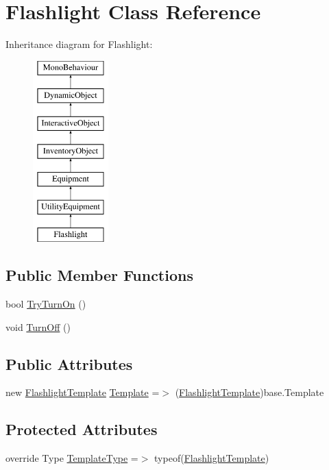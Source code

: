 \hypertarget{class_flashlight}{}\section{Flashlight Class Reference}
\label{class_flashlight}
Inheritance diagram for Flashlight\+:\begin{figure}[H]
\begin{center}
\leavevmode
\includegraphics[height=7.000000cm]{class_flashlight}
\end{center}
\end{figure}
\subsection*{Public Member Functions}
\begin{DoxyCompactItemize}
\item 
bool \mbox{\hyperlink{class_flashlight_a9cf56fe93b952c00c6fd3e7ea335eb26}{Try\+Turn\+On}} ()
\item 
void \mbox{\hyperlink{class_flashlight_adcf66c329c6f6fdc47ef2418fc55fb73}{Turn\+Off}} ()
\end{DoxyCompactItemize}
\subsection*{Public Attributes}
\begin{DoxyCompactItemize}
\item 
new \mbox{\hyperlink{class_flashlight_template}{Flashlight\+Template}} \mbox{\hyperlink{class_flashlight_a8f9854554124413d370b500dad133297}{Template}} =$>$ (\mbox{\hyperlink{class_flashlight_template}{Flashlight\+Template}})base.\+Template
\end{DoxyCompactItemize}
\subsection*{Protected Attributes}
\begin{DoxyCompactItemize}
\item 
override Type \mbox{\hyperlink{class_flashlight_a3c9c1e51028402a78612fd62cbda70d2}{Template\+Type}} =$>$ typeof(\mbox{\hyperlink{class_flashlight_template}{Flashlight\+Template}})
\end{DoxyCompactItemize}
